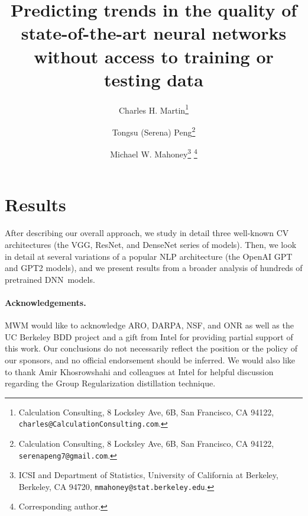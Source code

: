 \documentclass[11pt]{article}
\begin{document}
\title{%
Predicting trends in the quality of state-of-the-art neural networks without access to training or testing data
}

\author{%
Charles H. Martin\thanks{Calculation Consulting, 8 Locksley Ave, 6B, San Francisco, CA 94122, \texttt{charles@CalculationConsulting.com}.} 
\and 
Tongsu (Serena) Peng\thanks{Calculation Consulting, 8 Locksley Ave, 6B, San Francisco, CA 94122, \texttt{serenapeng7@gmail.com}.}
\and
Michael W. Mahoney\thanks{ICSI and Department of Statistics, University of California at Berkeley, Berkeley, CA 94720, \texttt{mmahoney@stat.berkeley.edu}.}
\thanks{Corresponding author.}
}

\date{}
\maketitle



\begin{abstract}

\end{abstract}




\section{Results}
After describing our overall approach, we study in detail three well-known CV architectures (the VGG, ResNet, and DenseNet series of models).
Then, we look in detail at several variations of a popular NLP architecture (the OpenAI GPT and GPT2 models), and we present results from a broader analysis of hundreds of pretrained DNN~models.











\noindent
\paragraph{Acknowledgements.}
MWM would like to acknowledge ARO, DARPA, NSF, and ONR as well as the UC Berkeley BDD project and a gift from Intel for providing partial support of this work.
Our conclusions do not necessarily reflect the position or the policy of our sponsors, and no official endorsement should be inferred.
We would also like to thank Amir Khosrowshahi and colleagues at Intel for helpful discussion regarding the Group Regularization distillation technique.


%
{\small
%

%
}

\appendix

\end{document}
